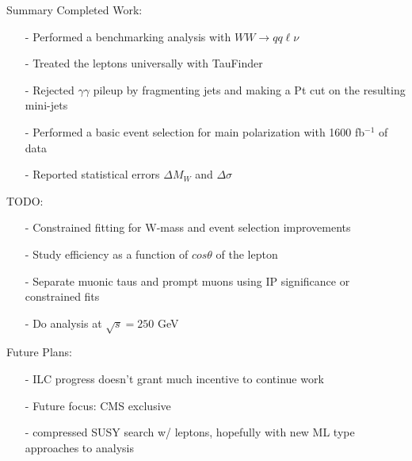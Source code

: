 \documentclass[10pt]{beamer}
\begin{document}
\begin{frame}{Summary}
\scriptsize
Completed Work:
\begin{itemize}
	\item[-] Performed a benchmarking analysis with $WW\rightarrow qq\ell\nu$
	\item[-] Treated the leptons universally with TauFinder
	\item[-] Rejected $\gamma \gamma$ pileup by fragmenting jets and making a Pt cut on the resulting mini-jets
	\item[-] Performed a basic event selection for main polarization with 1600 fb$^{-1}$ of data
	\item[-] Reported statistical errors $\Delta M_W$ and $\Delta\sigma$
	
\end{itemize}
TODO:
\begin{itemize}
	\item[-] Constrained fitting for W-mass and event selection improvements
	\item[-] Study efficiency as a function of $cos\theta$ of the lepton 
	\item[-] Separate muonic taus and prompt muons using IP significance or constrained fits
	\item[-] Do analysis at $\sqrt{s} = 250$ GeV

\end{itemize}
Future Plans:
\begin{itemize}
	\item[-] ILC progress doesn't grant much incentive to continue work
	\item[-] Future focus: CMS exclusive
	\item[-] compressed SUSY search w/ leptons, hopefully with new ML type approaches to analysis

\end{itemize}

\end{frame}
\end{document}
